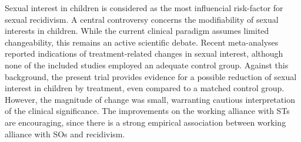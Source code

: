 \documentclass[
  super,
  preprint,
  1p,
  onecolumn]{elsarticle}
\begin{document}
Sexual interest in children is considered as the most influencial
risk-factor for sexual recidivism.
\citep{setoEmpiricallybasedDynamicRisk2023} A central controversy
concerns the modifiability of sexual interests in children. While the
current clinical paradigm assumes limited changeability, this remains an
active scientific debate. Recent meta-analyses reported indications of
treatment‑related changes in sexual interest, although none of the
included studies employed an adequate control group.
\citep{beggschristoffersonArousalManagementTechniques2026, mcphailInterventionsPedohebephilicArousal2020}
Against this background, the present trial provides evidence for a
possible reduction of sexual interest in children by treatment, even
compared to a matched control group. However, the magnitude of change
was small, warranting cautious interpretation of the clinical
significance. The improvements on the working alliance with STs are
encouraging, since there is a strong empirical association between
working alliance with SOs and recidivism.
\citep{sturmPriceMistrustStudy2022}
\end{document}
